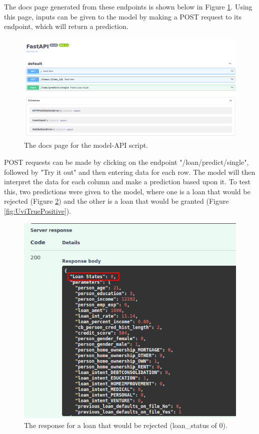 \documentclass[12pt]{report}
\newcommand{\para}{\vspace{7pt}\noindent}
\begin{document}
\para The docs page generated from these endpoints is shown below in Figure \ref{fig:UviDocs}.
Using this page, inputs can be given to the model by making a POST request to its endpoint, 
which will return a prediction.

\begin{figure}[H]
    \centering
    \includegraphics[width=\linewidth]{Implementation/FastAPI+Uvi/DocsPage.png}
    \caption{The docs page for the model-API script.}
    \label{fig:UviDocs}
\end{figure}

\para POST requests can be made by clicking on the endpoint "/loan/predict/single",
followed by "Try it out" and then entering data for each row. The model will then 
interpret the data for each column and make a prediction based upon it. To test this, 
two predictions were given to the model, where one is a loan that would be rejected (Figure \ref{fig:UviTrueNegative})
and the other is a loan that would be granted (Figure \ref{fig:UviTruePositive}). 

\begin{figure}[H]
    \centering
    \includegraphics[width=\linewidth]{Implementation/FastAPI+Uvi/TrueNegative.png}
    \caption{The response for a loan that would be rejected (loan\_status of 0).}
    \label{fig:UviTrueNegative}
\end{figure}
\end{document}
